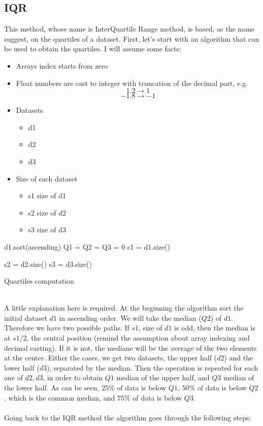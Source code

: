 \documentclass[12pt,twoside]{report}
\begin{document}
\subsection{IQR}
This method, whose name is InterQuartile Range method, is based, as the name suggest, on the quartiles of a dataset. First, let's start with an algorithm that can be used to obtain the quartiles. I will assume some facts:
\begin{itemize}
    \item Arrays index starts from zero
    \item Float numbers are cast to integer with truncation of the decimal part, e.g.
    $$1.2 \to 1$$
    $$-1.8 \to -1$$
    \item Datasets
    \begin{itemize}
        \item d1
        \item d2
        \item d3
    \end{itemize}
    \item Size of each dataset
    \begin{itemize}
        \item s1
        \subitem size of d1
        \item s2
        \subitem size of d2
        \item s3
        \subitem size of d3
    \end{itemize}
\end{itemize}

\begin{algorithm}[H]
\SetAlgoLined
{}
d1.sort(ascending)\;
Q1 = Q2 = Q3 = 0\;
s1 = d1.size()\;

s2 = d2.size()\;
s3 = d3.size()\;
 \caption{Quartiles computation}
\end{algorithm}
\noindent \\A little explanation here is required. At the beginning the algorithm sort the initial dataset $d1$ in ascending order. We will take the median ($Q2$) of $d1$. Therefore we have two possible paths. If $s1$, size of $d1$ is odd, then the median is at $s1/2$, the central position (remind the assumption about array indexing and decimal casting). If it is not, the mediane will be the average of the two elements at the center. Either the cases, we get two datasets, the upper half ($d2$) and the lower half ($d3$), separated by the median. Then the operation is repeated for each one of $d2,d3$, in order to obtain $Q1$ median of the upper half, and $Q3$ median of the lower half. As can be seen, $25\%$ of data is below $Q1$, $50\%$ of data is below $Q2$, which is the common median, and $75\%$ of data is below $Q3$. \\\\Going back to the IQR method the algorithm goes through the following steps:
\end{document}
